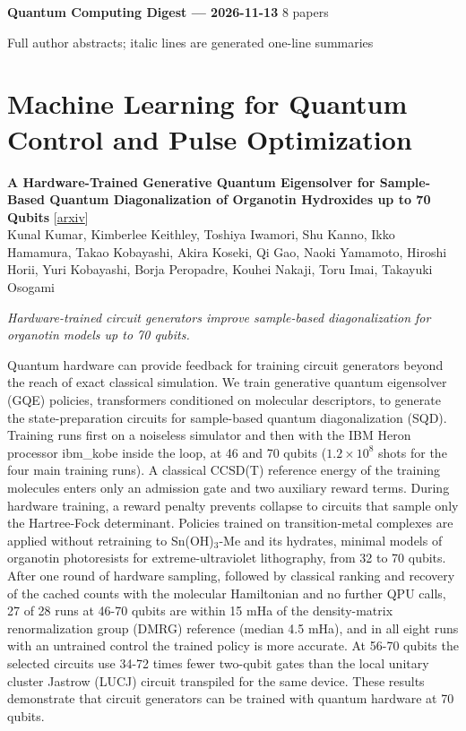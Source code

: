 \documentclass[12pt,letterpaper]{article}
\begin{document}
{\footnotesize\textbf{Quantum Computing Digest --- 2026-11-13} \hfill 8 papers}

{\scriptsize Full author abstracts; italic lines are generated one-line summaries}
\section*{Machine Learning for Quantum Control and Pulse Optimization}
{\small\textbf{A Hardware-Trained Generative Quantum Eigensolver for Sample-Based Quantum Diagonalization of Organotin Hydroxides up to 70 Qubits}} {\scriptsize[\href{https://arxiv.org/abs/2611.13755}{arxiv}]}\nopagebreak\\
{\scriptsize Kunal Kumar, Kimberlee Keithley, Toshiya Iwamori, Shu Kanno, Ikko Hamamura, Takao Kobayashi, Akira Koseki, Qi Gao, Naoki Yamamoto, Hiroshi Horii, Yuri Kobayashi, Borja Peropadre, Kouhei Nakaji, Toru Imai, Takayuki Osogami}\nopagebreak\\[2pt]
{\footnotesize\textit{Hardware-trained circuit generators improve sample-based diagonalization for organotin models up to 70 qubits.}\par}\nopagebreak
{\footnotesize Quantum hardware can provide feedback for training circuit generators beyond the reach of exact classical simulation. We train generative quantum eigensolver (GQE) policies, transformers conditioned on molecular descriptors, to generate the state-preparation circuits for sample-based quantum diagonalization (SQD). Training runs first on a noiseless simulator and then with the IBM Heron processor ibm\_kobe inside the loop, at 46 and 70 qubits ($1.2 \times 10^8$ shots for the four main training runs). A classical CCSD(T) reference energy of the training molecules enters only an admission gate and two auxiliary reward terms. During hardware training, a reward penalty prevents collapse to circuits that sample only the Hartree-Fock determinant. Policies trained on transition-metal complexes are applied without retraining to Sn(OH)$_3$-Me and its hydrates, minimal models of organotin photoresists for extreme-ultraviolet lithography, from 32 to 70 qubits. After one round of hardware sampling, followed by classical ranking and recovery of the cached counts with the molecular Hamiltonian and no further QPU calls, 27 of 28 runs at 46-70 qubits are within 15 mHa of the density-matrix renormalization group (DMRG) reference (median 4.5 mHa), and in all eight runs with an untrained control the trained policy is more accurate. At 56-70 qubits the selected circuits use 34-72 times fewer two-qubit gates than the local unitary cluster Jastrow (LUCJ) circuit transpiled for the same device. These results demonstrate that circuit generators can be trained with quantum hardware at 70 qubits.\par}
\end{document}
